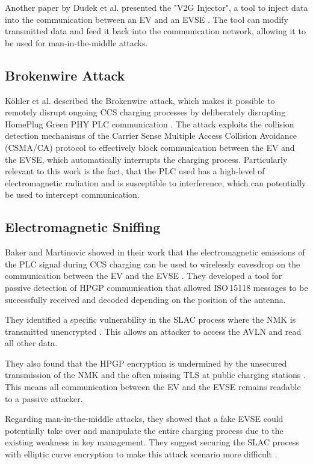 \documentclass[sigconf]{acmart}
\begin{document}
Another paper by Dudek et al. presented the "V2G Injector", a tool to inject data into the communication between an EV and an EVSE \citep[pp.\,24--25]{dudek-v2g-2019}. The tool can modify transmitted data and feed it back into the communication network, allowing it to be used for man-in-the-middle attacks.

\subsection{Brokenwire Attack}
Köhler et al. described the Brokenwire attack, which makes it possible to remotely disrupt ongoing CCS charging processes by deliberately disrupting HomePlug Green PHY PLC communication \citep[pp.\,4--6]{kohler-brokenwire-2022}. The attack exploits the collision detection mechanisms of the Carrier Sense Multiple Access Collision Avoidance (CSMA/CA) protocol to effectively block communication between the EV and the EVSE, which automatically interrupts the charging process. Particularly relevant to this work is the fact, that the PLC used has a high-level of electromagnetic radiation and is susceptible to interference, which can potentially be used to intercept communication.

\subsection{Electromagnetic Sniffing}
Baker and Martinovic showed in their work that the electromagnetic emissions of the PLC signal during CCS charging can be used to wirelessly eavesdrop on the communication between the EV and the EVSE \citep[pp.\,1--2, 7--8]{baker-losing-2019}. They developed a tool for passive detection of HPGP communication that allowed ISO\,15118 messages to be successfully received and decoded depending on the position of the antenna.

They identified a specific vulnerability in the SLAC process where the NMK is transmitted unencrypted \citep[pp.\,9--10]{baker-losing-2019}. This allows an attacker to access the AVLN and read all other data.

They also found that the HPGP encryption is undermined by the unsecured transmission of the NMK and the often missing TLS at public charging stations \citep[pp.\,9--12]{baker-losing-2019}. This means all communication between the EV and the EVSE remains readable to a passive attacker.

\iffalse
Regarding man-in-the-middle attacks, they showed that a fake EVSE could potentially take over and manipulate the entire charging process due to the existing weakness in key management. They suggest securing the SLAC process with elliptic curve encryption to make this attack scenario more difficult \citep[pp.\,17--18]{baker-losing-2019}.
\end{document}
